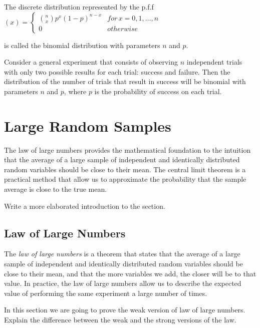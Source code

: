 \begin{definition}
The discrete distribution represented by the p.f.f $\left(x\right)=\begin{cases}
{n \choose x}p^{x}\left(1-p\right)^{n-x} & for\,x=0,1,\ldots,n\\
0 & otherwise
\end{cases}$
\end{definition}

{\color{red} is called the binomial distribution with parameters $n$ and $p$.}

{\color{red} Consider a general experiment that consists of observing $n$ independent trials with only two possible results for each trial: success and failure. Then the distribution of the number of trials that result in success will be binomial with parameters $n$ and $p$, where $p$ is the probability of success on each trial.} 


%
%

\section{Large Random Samples}
\label{sec:probability_random_samples}

The law of large numbers provides the mathematical foundation to the intuition that the average of a large sample of independent and identically distributed random variables should be close to their mean. The central limit theorem is a practical method that allow us to approximate the probability that the sample average is close to the true mean.

{\color{red} Write a more elaborated introduction to the section.}


\subsection{Law of Large Numbers}

The \emph{law of large numbers} is a theorem that states that the average of a large sample of independent and identically distributed random variables should be close to their mean, and that the more variables we add, the closer will be to that value. In practice, the law of large numbers allow us to describe the expected value of performing the same experiment a large number of times.

In this section we are going to prove the weak version of law of large numbers. {\color{red} Explain the difference between the weak and the strong versions of the law.}

